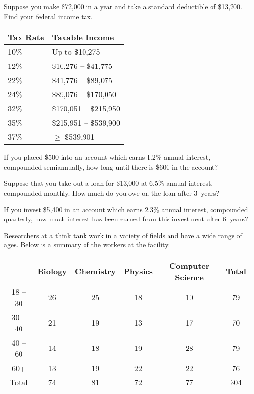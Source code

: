 \documentclass[12pt,letterpaper]{exam}
\begin{document}
\begin{questions}
\newpage
\question[10] Suppose you make \$72,000 in a year and take a standard deductible of \$13,200. Find your federal income tax. \par
	\begin{table}[!ht]
	\centering
	\begin{tabular}{|l|l|} \hline
	Tax Rate & Taxable Income \\ \hline \hline
	10\% & Up to \$10,275 \\ \hline
	12\% & \$10,276 -- \$41,775 \\ \hline
	22\% & \$41,776 -- \$89,075 \\ \hline
	24\% & \$89,076 -- \$170,050 \\ \hline
	32\% & \$170,051 -- \$215,950 \\ \hline
	35\% & \$215,951 -- \$539,900 \\ \hline
	37\% & $\geq$ \$539,901 \\ \hline
	\end{tabular}
	\end{table}



\newpage
\question[10] If you placed \$500 into an account which earns 1.2\% annual interest, compounded semiannually, how long until there is \$600 in the account? 



\newpage
\question[10] Suppose that you take out a loan for \$13,000 at 6.5\% annual interest, compounded monthly. How much do you owe on the loan after 3~years?



\newpage
\question[10] If you invest \$5,400 in an account which earns 2.3\% annual interest, compounded quarterly, how much interest has been earned from this investment after 6~years?



\newpage
\question[10] Researchers at a think tank work in a variety of fields and have a wide range of ages. Below is a summary of the workers at the facility. \par
	\begin{table}[!ht]
	\centering
	\begin{tabular}{|c||c|c|c|c||c|} \hline
	& Biology & Chemistry & Physics & Computer Science & Total \\ \hline
	18 -- 30 & 26 & 25 & 18 & 10 & 79 \\ \hline
	30 -- 40 & 21 & 19 & 13 & 17 & 70 \\ \hline 
	40 -- 60 & 14 & 18 & 19 & 28 & 79 \\ \hline
	60+ & 13 & 19 & 22 & 22 & 76 \\ \hline \hline
	Total & 74 & 81 & 72 & 77 & 304 \\ \hline
	\end{tabular}
	\end{table} \par


\end{questions}
\end{document}
